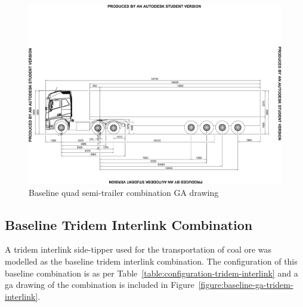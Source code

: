 \begin{landscape}\centering
\vspace*{\fill}
\begin{figure}[H]
	\centering
	\includegraphics[width=1.3\textwidth]{fig/baseline_ga_quad-semi}
	\caption{Baseline quad semi-trailer combination GA drawing}
	\label{figure:baseline-ga-quad-semi}
\end{figure}
\vfill
\end{landscape}

\restoregeometry



\subsection{Baseline Tridem Interlink Combination}\label{section:baseline-tridem-interlink}

A tridem interlink side-tipper used for the transportation of coal ore was modelled as the baseline tridem interlink combination. The configuration of this baseline combination is as per Table~\ref{table:configuration-tridem-interlink} and a \gls{ga} drawing of the combination is included in Figure~\ref{figure:baseline-ga-tridem-interlink}.

